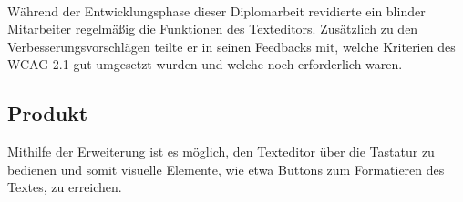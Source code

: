 \mbox{}\\Während der Entwicklungsphase dieser Diplomarbeit revidierte ein blinder Mitarbeiter regelmäßig die Funktionen des Texteditors. Zusätzlich zu den Verbesserungsvorschlägen teilte er in seinen Feedbacks mit, welche Kriterien des WCAG 2.1 gut umgesetzt wurden und welche noch erforderlich waren.

\subsection{Produkt}
Mithilfe der Erweiterung ist es möglich, den Texteditor über die Tastatur zu bedienen und somit visuelle Elemente, wie etwa Buttons zum Formatieren des Textes, zu erreichen. 